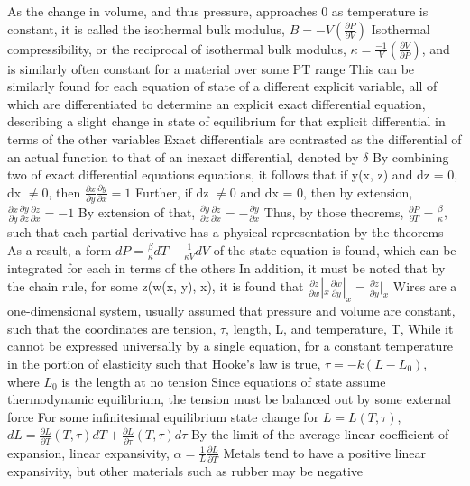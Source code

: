 \begin{outline*}
\4 As the change in volume, and thus pressure, approaches 0 as temperature is constant, it is called the isothermal bulk modulus, $B = -V(\frac{\partial P}{\partial V})$
\4 Isothermal compressibility, or the reciprocal of isothermal bulk modulus, $\kappa = \frac{-1}{V}(\frac{\partial V}{\partial P})$, and is similarly often constant for a material over some PT range
\2 This can be similarly found for each equation of state of a different explicit variable, all of which are differentiated to determine an explicit exact differential equation, describing a slight change in state of equilibrium for that explicit differential in terms of the other variables
\3 Exact differentials are contrasted as the differential of an actual function to that of an inexact differential, denoted by $\delta$
\3 By combining two of exact differential equations equations, it follows that if y(x, z) and dz = 0, dx $\neq 0$, then $\frac{\partial x}{\partial y}\frac{\partial y}{\partial x} = 1$
\4 Further, if dz $\neq 0$ and dx = 0, then by extension, $\frac{\partial x}{\partial y}\frac{\partial y}{\partial z}\frac{\partial z}{\partial x} = -1$
\4 By extension of that, $\frac{\partial y}{\partial z}\frac{\partial z}{\partial x} = -\frac{\partial y}{\partial x}$
\3 Thus, by those theorems, $\frac{\partial P}{\partial T} = \frac{\beta}{\kappa}$, such that each partial derivative has a physical representation by the theorems
\4 As a result, a form $dP = \frac{\beta}{\kappa}dT - \frac{1}{\kappa V}dV$ of the state equation is found, which can be integrated for each in terms of the others
\3 In addition, it must be noted that by the chain rule, for some z(w(x, y), x), it is found that $\frac{\partial z}{\partial w}|_x\frac{\partial w}{\partial y}|_x = \frac{\partial z}{\partial y}|_x$
\1 Wires are a one-dimensional system, usually assumed that pressure and volume are constant, such that the coordinates are tension, $\tau$, length, L, and temperature, T,
\2 While it cannot be expressed universally by a single equation, for a constant temperature in the portion of elasticity such that Hooke's law is true, $\tau = -k(L - L_0)$, where $L_0$ is the length at no tension
\3 Since equations of state assume thermodynamic equilibrium, the tension must be balanced out by some external force
\2 For some infinitesimal equilibrium state change for $L = L(T, \tau)$, $dL = \frac{\partial L}{\partial T}(T, \tau)dT + \frac{\partial L}{\partial \tau}(T, \tau)d\tau$
\3 By the limit of the average linear coefficient of expansion, linear expansivity, $\alpha = \frac{1}{L}\frac{\partial L}{\partial T}$
\4 Metals tend to have a positive linear expansivity, but other materials such as rubber may be negative

\end{outline*}
